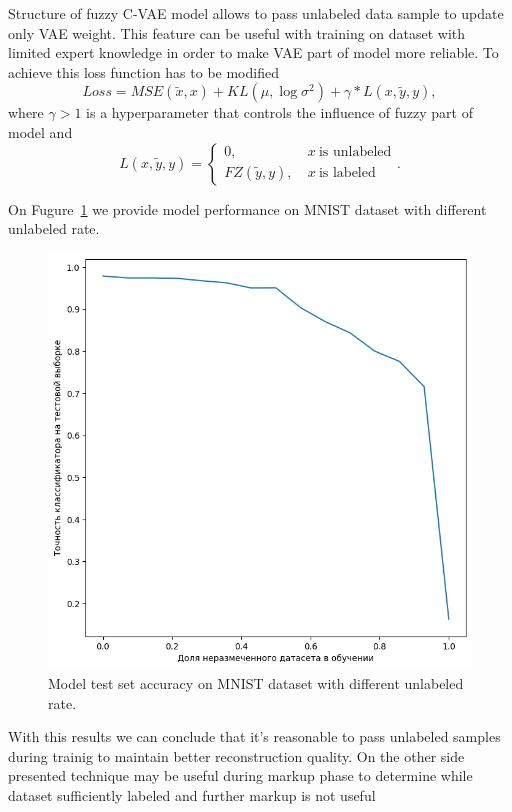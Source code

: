 \documentclass[runningheads]{llncs}
\begin{document}
Structure of fuzzy C-VAE model allows to pass unlabeled data sample to update only VAE weight.
This feature can be useful with training on dataset with limited expert knowledge in order to make VAE part of model more reliable.
To achieve this loss function has to be modified
\[
    Loss = MSE(\tilde{x}, x) + KL(\mu, \log{\sigma^2}) + \gamma * L(x, \tilde{y}, y),
\]
where $\gamma > 1$ is a hyperparameter that controls the influence of fuzzy part of model and
\[
    L(x, \tilde{y}, y) = \begin{cases}
        0,&~x~\mbox{is~unlabeled}\\
        FZ(\tilde{y}, y),&~x~\mbox{is~labeled}
      \end{cases}.
\]

On Fugure~\ref{fig:accuracy-vs-unlabeled-rate} we provide model performance on MNIST dataset with different unlabeled rate.

\begin{figure}[h]  
    \centering
    \includegraphics[width=1\textwidth]{fig5-accuracy-vs-unlabeled-rate.png}
    \caption{ Model test set accuracy on MNIST dataset with different unlabeled rate. }\label{fig:accuracy-vs-unlabeled-rate}
\end{figure}

With this results we can conclude that it's reasonable to pass unlabeled samples during trainig to maintain better reconstruction quality.
On the other side presented technique may be useful during markup phase to determine while dataset sufficiently labeled and further markup is not useful
\end{document}
